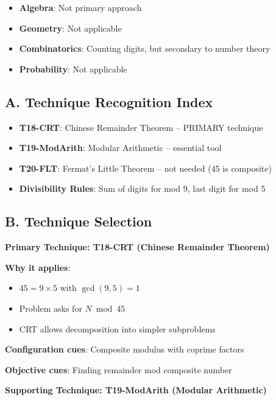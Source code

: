 \documentclass[11pt]{article}
\begin{document}
\begin{tacticalbox}
\begin{itemize}[leftmargin=*]
    \item \textbf{Algebra}: Not primary approach
    
    \item \textbf{Geometry}: Not applicable
    
    \item \textbf{Combinatorics}: Counting digits, but secondary to number theory
    
    \item \textbf{Probability}: Not applicable
\end{itemize}
\end{tacticalbox}

\begin{techniquesbox}
\subsection*{A. Technique Recognition Index}
\begin{itemize}[leftmargin=*]
    \item \textbf{T18-CRT}: Chinese Remainder Theorem -- PRIMARY technique
    \item \textbf{T19-ModArith}: Modular Arithmetic -- essential tool
    \item \textbf{T20-FLT}: Fermat's Little Theorem -- not needed (45 is composite)
    \item \textbf{Divisibility Rules}: Sum of digits for mod 9, last digit for mod 5
\end{itemize}

\subsection*{B. Technique Selection}
\textbf{Primary Technique: T18-CRT (Chinese Remainder Theorem)}

\textbf{Why it applies}:
\begin{itemize}
    \item $45 = 9 \times 5$ with $\gcd(9,5) = 1$
    \item Problem asks for $N \bmod 45$
    \item CRT allows decomposition into simpler subproblems
\end{itemize}

\textbf{Configuration cues}: Composite modulus with coprime factors

\textbf{Objective cues}: Finding remainder mod composite number

\textbf{Supporting Technique: T19-ModArith (Modular Arithmetic)}


\end{techniquesbox}
\end{document}
